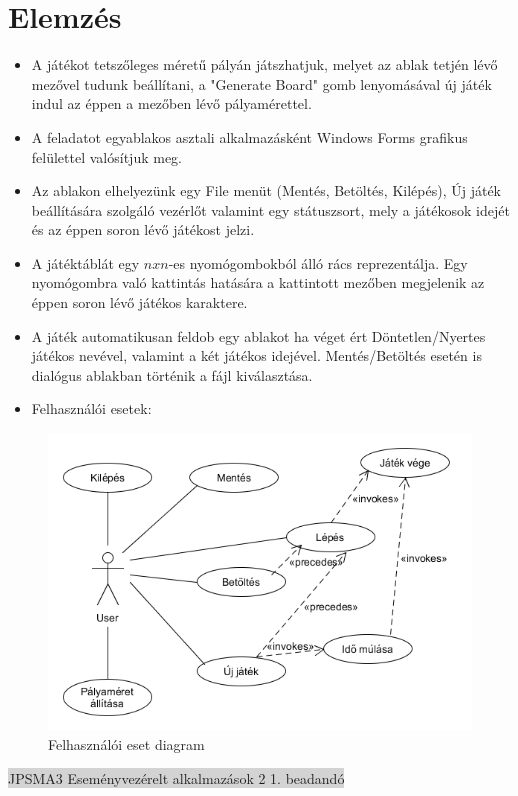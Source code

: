 \documentclass[11pt,a4paper]{article}
\begin{document}
\section{Elemzés}
\begin{itemize}
	\item A játékot tetszőleges méretű pályán játszhatjuk, melyet az ablak tetjén lévő
	mezővel tudunk beállítani, a "Generate Board" gomb lenyomásával új játék indul az
	éppen a mezőben lévő pályamérettel.
	\item A feladatot egyablakos asztali alkalmazásként Windows Forms grafikus felülettel
	valósítjuk meg.
	\item Az ablakon elhelyezünk egy File menüt (Mentés, Betöltés, Kilépés), Új játék
	beállítására szolgáló vezérlőt valamint egy státuszsort, mely a játékosok idejét és
	az éppen soron lévő játékost jelzi.
	\item A játéktáblát egy $nxn$-es nyomógombokból álló rács reprezentálja. Egy
	nyomógombra való kattintás hatására a kattintott mezőben megjelenik az éppen soron lévő játékos karaktere.
	\item A játék automatikusan feldob egy ablakot ha véget ért Döntetlen/Nyertes játékos
	nevével, valamint a két játékos idejével. Mentés/Betöltés esetén is dialógus ablakban
	történik a fájl kiválasztása.
	\item Felhasználói esetek:
\end{itemize}
\begin{figure}[h]
	\centering
	  \includegraphics[width=12cm]{UMLs/UseCase.png}
	\caption{Felhasználói eset diagram}
\end{figure}
\newpage
\thispagestyle{empty}
\begin{center}
	\colorbox{lightgray}{{\large JPSMA3} \hspace{3cm} {\large Eseményvezérelt alkalmazások 2 1. beadandó} \hspace{5cm} \thepage}
\end{center}
\end{document}
